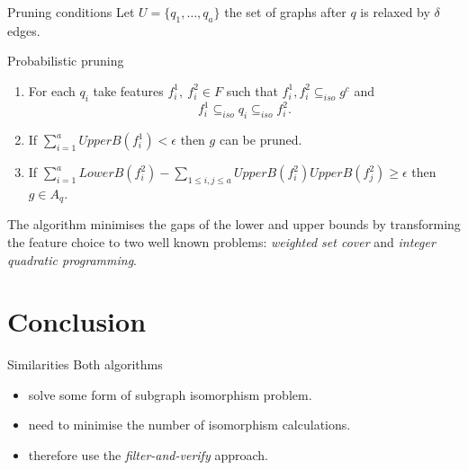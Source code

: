 \documentclass[10pt, aspectratio=149]{beamer}
\begin{document}
\begin{frame}{Pruning conditions}
Let $U = \{q_1, \ldots, q_a\}$ the set of graphs after $q$ is relaxed by $\delta$ edges.

\begin{block}{Probabilistic pruning}
  \begin{enumerate}
      \item For each $q_i$ take features $f_i^1, \  f_i^2 \in F$ such that $f_i^1, f_i^2 \subseteq_{iso} g^c$ and
      $$
      f_i^1 \subseteq_{iso} q_i \subseteq_{iso} f_i^2.
      $$
      
      \item If $\sum_{i=1}^a UpperB(f_i^1) < \epsilon$ then $g$ can be pruned.
      
      \item If $\sum_{i=1}^a LowerB(f_i^2) -  \sum_{1\leq i,j \leq a} UpperB(f_i^2)UpperB(f_j^2) \geq \epsilon$ then $g \in A_q$.
  \end{enumerate}
\end{block}

 The algorithm minimises the gaps of the lower and upper bounds by transforming the feature choice to two well known problems: \textit{weighted set cover} and \textit{integer quadratic programming}.
\end{frame}



\section{Conclusion}

\begin{frame}{Similarities}
 Both algorithms 
    \begin{itemize}
        \item solve some form of subgraph isomorphism problem.
        
        \item need to minimise the number of isomorphism calculations.
        
        \item therefore use the \textit{filter-and-verify} approach.
    \end{itemize}
\end{frame}
\end{document}
